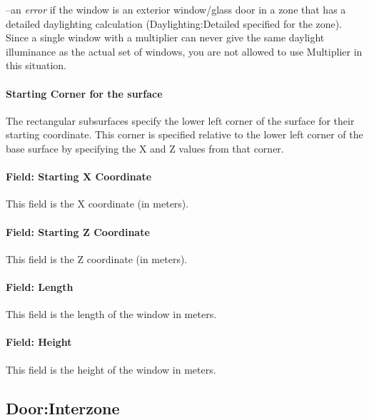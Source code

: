 --an \emph{error} if the window is an exterior window/glass door in a zone that has a detailed daylighting calculation (Daylighting:Detailed specified for the zone). Since a single window with a multiplier can never give the same daylight illuminance as the actual set of windows, you are not allowed to use Multiplier in this situation.

\paragraph{Starting Corner for the surface}\label{starting-corner-for-the-surface-13}

The rectangular subsurfaces specify the lower left corner of the surface for their starting coordinate. This corner is specified relative to the lower left corner of the base surface by specifying the X and Z values from that corner.

\paragraph{Field: Starting X Coordinate}\label{field-starting-x-coordinate-13}

This field is the X coordinate (in meters).

\paragraph{Field: Starting Z Coordinate}\label{field-starting-z-coordinate-13}

This field is the Z coordinate (in meters).

\paragraph{Field: Length}\label{field-length-13}

This field is the length of the window in meters.

\paragraph{Field: Height}\label{field-height-7}

This field is the height of the window in meters.

\subsection{Door:Interzone}\label{doorinterzone}

